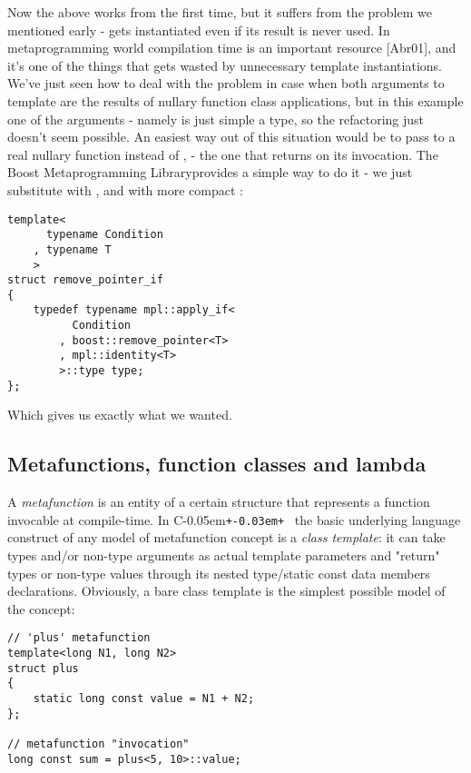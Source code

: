 \documentclass{netobjectdays}
\newcommand{\Cpp}{C\kern-0.05em\texttt{+\kern-0.03em+}%
}
\newcommand{\Mpl}{Boost Meta\-program\-ming Library}
\begin{document}
Now the above works from the first time, but it suffers from the 
problem we mentioned early -  gets 
instantiated even if its result is never used. In metaprogramming 
world compilation time is an important resource [Abr01], and it's 
one of the things that gets wasted by unnecessary template 
instantiations. We've just seen how to deal with the problem in 
case when both arguments to  template are the 
results of nullary function class applications, but in this example 
one of the arguments - namely  is just simple a type, so 
the refactoring just doesn't seem possible. An easiest way out of 
this situation would be to pass to  a real 
nullary function instead of , - the one that returns 
 on its invocation. The \Mpl provides a simple way to do it -
we just substitute  with ,
and  with more compact 
:

{\footnotesize
\begin{verbatim}
template<
      typename Condition
    , typename T
    >
struct remove_pointer_if
{
    typedef typename mpl::apply_if<
          Condition
        , boost::remove_pointer<T>
        , mpl::identity<T>
        >::type type;
};
\end{verbatim}
}

Which gives us exactly what we wanted.


\subsection{Metafunctions, function classes and lambda}


A \emph{metafunction} is an entity of a certain structure that
represents a function invocable at compile-time.  In \Cpp\, the basic
underlying language construct of any model of metafunction concept is
a \emph{class template}: it can take types and/or non-type arguments
as actual template parameters and "return" types or non-type values
through its nested type/static const data members
declarations. Obviously, a bare class template is the simplest
possible model of the concept:

{\footnotesize
\begin{verbatim}
// 'plus' metafunction
template<long N1, long N2>
struct plus
{
    static long const value = N1 + N2;
};

// metafunction "invocation"
long const sum = plus<5, 10>::value;
\end{verbatim}
}
\end{document}
